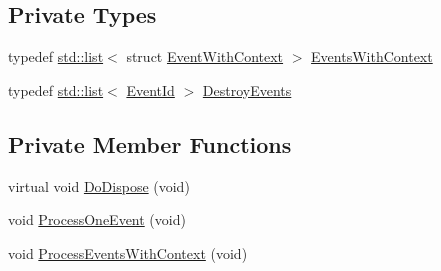 \subsection*{Private Types}
\begin{DoxyCompactItemize}
\item 
typedef \hyperlink{openflow-interface_8h_afd9bcfa176617760671b67580f536fa7}{std\+::list}$<$ struct \hyperlink{structns3_1_1DefaultSimulatorImpl_1_1EventWithContext}{Event\+With\+Context} $>$ \hyperlink{classns3_1_1DefaultSimulatorImpl_a69a45d09d4651865afada01a8713ed38}{Events\+With\+Context}
\item 
typedef \hyperlink{openflow-interface_8h_afd9bcfa176617760671b67580f536fa7}{std\+::list}$<$ \hyperlink{classns3_1_1EventId}{Event\+Id} $>$ \hyperlink{classns3_1_1DefaultSimulatorImpl_ab9b6e40c5839c9e5755451f7c5e75406}{Destroy\+Events}
\end{DoxyCompactItemize}
\subsection*{Private Member Functions}
\begin{DoxyCompactItemize}
\item 
virtual void \hyperlink{classns3_1_1DefaultSimulatorImpl_ae5402f99dfc9767491c94f8069e97514}{Do\+Dispose} (void)
\item 
void \hyperlink{classns3_1_1DefaultSimulatorImpl_a743e884e74c5db845cc2b8f1779e0e9d}{Process\+One\+Event} (void)
\item 
void \hyperlink{classns3_1_1DefaultSimulatorImpl_a12c1a6db6cde026ebbcad4f37091392f}{Process\+Events\+With\+Context} (void)
\end{DoxyCompactItemize}
